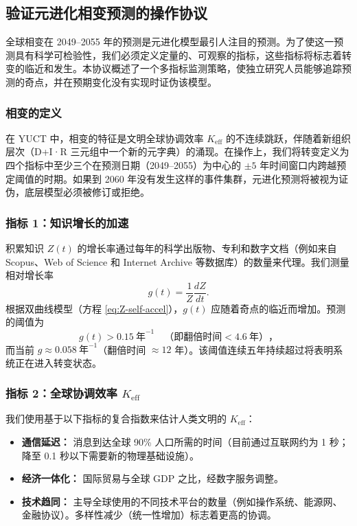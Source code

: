 \documentclass[12pt,a4paper]{article}
\theoremstyle{remark}
\begin{document}
		\subsection{验证元进化相变预测的操作协议}
		\label{subsec:forecast-protocol}
		
		全球相变在 2049–2055 年的预测是元进化模型最引人注目的预测。为了使这一预测具有科学可检验性，我们必须定义定量的、可观察的指标，这些指标将标志着转变的临近和发生。本协议概述了一个多指标监测策略，使独立研究人员能够追踪预测的奇点，并在预期变化没有实现时证伪该模型。
		
		\subsubsection{相变的定义}
		
		在 YUCT 中，相变的特征是文明全球协调效率 $K_{\text{eff}}$ 的不连续跳跃，伴随着新组织层次（D+I·R 三元组中一个新的元字典）的涌现。在操作上，我们将转变定义为四个指标中至少三个在预测日期（2049–2055）为中心的 $\pm 5$ 年时间窗口内跨越预定阈值的时期。如果到 2060 年没有发生这样的事件集群，元进化预测将被视为证伪，底层模型必须被修订或拒绝。
		
		\subsubsection{指标 1：知识增长的加速}
		
		积累知识 $Z(t)$ 的增长率通过每年的科学出版物、专利和数字文档（例如来自 Scopus、Web of Science 和 Internet Archive 等数据库）的数量来代理。我们测量相对增长率
		\[
		g(t) = \frac{1}{Z}\frac{dZ}{dt}.
		\]
		根据双曲线模型（方程 \ref{eq:Z-self-accel}），$g(t)$ 应随着奇点的临近而增加。预测的阈值为
		\[
		g(t) > 0.15\ \text{年}^{-1} \quad（即翻倍时间 < 4.6\ \text{年}），
		\]
		而当前 $g\approx 0.058\ \text{年}^{-1}$（翻倍时间 $\approx 12$ 年）。该阈值连续五年持续超过将表明系统正在进入转变状态。
		
		\subsubsection{指标 2：全球协调效率 $K_{\text{eff}}$}
		
		我们使用基于以下指标的复合指数来估计人类文明的 $K_{\text{eff}}$：
		
		\begin{itemize}
			\item \textbf{通信延迟：} 消息到达全球 90\% 人口所需的时间（目前通过互联网约为 1 秒；降至 0.1 秒以下需要新的物理基础设施）。
			\item \textbf{经济一体化：} 国际贸易与全球 GDP 之比，经数字服务调整。
			\item \textbf{技术趋同：} 主导全球使用的不同技术平台的数量（例如操作系统、能源网、金融协议）。多样性减少（统一性增加）标志着更高的协调。
		\end{itemize}
		
\end{document}

